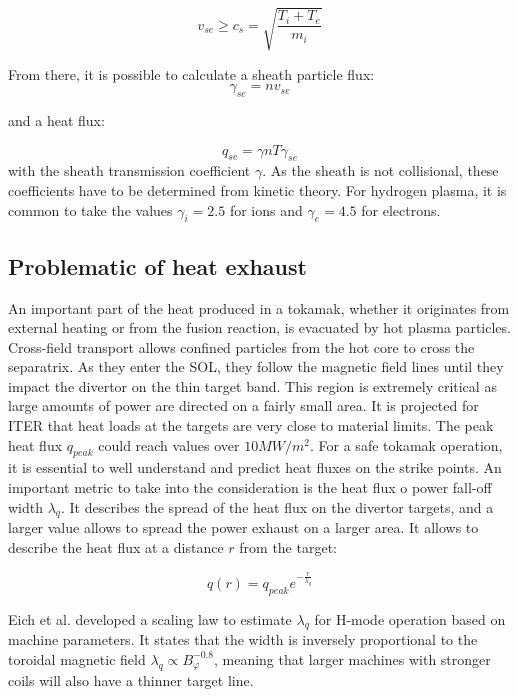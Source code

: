 \begin{equation}
	\label{eq:intro_BohmCriterion}
	v_{se} \ge c_s = \sqrt{\frac{T_i+T_e}{m_i}}
\end{equation}

From there, it is possible to calculate a sheath particle flux:
\begin{equation}
	\gamma_{se} = nv_{se}
\end{equation}

and a heat flux:

\begin{equation}
	q_{se} = \gamma n T \gamma_{se}
\end{equation}
with the sheath transmission coefficient $\gamma$. As the sheath is not collisional, these coefficients have to be determined from kinetic theory\cite{Stangeby_2000}. For hydrogen plasma, it is common to take the values $\gamma_i = 2.5$ for ions and $\gamma_e = 4.5$ for electrons.


\subsection{Problematic of heat exhaust}
\label{ssec:intro_heatExhaust}
An important part of the heat produced in a tokamak, whether it originates from external heating or from the fusion reaction, is evacuated by hot plasma particles. Cross-field transport allows confined particles from the hot core to cross the separatrix. As they enter the SOL, they follow the magnetic field lines until they impact the divertor on the thin target band. This region is extremely critical as large amounts of power are directed on a fairly small area. It is projected for ITER that heat loads at the targets are very close to material limits\cite{gunn2017surface}. The peak heat flux $q_{peak}$ could reach values over $10MW/m^2$. For a safe tokamak operation, it is essential to well understand and predict heat fluxes on the strike points. An important metric to take into the consideration is the heat flux o power fall-off width $\lambda_q$. It describes the spread of the heat flux on the divertor targets, and a larger value allows to spread the power exhaust on a larger area. It allows to describe the heat flux at a distance $r$ from the target:

\begin{equation}
	q(r) =  q_{peak}e^{-\frac{r}{\lambda_q}}
\end{equation}

Eich et al.\cite{eich2013scaling} developed a scaling law to estimate $\lambda_q$ for H-mode operation based on machine parameters. It states that the width is inversely proportional to the toroidal magnetic field $\lambda_q\propto B_\varphi^{-0.8}$, meaning that larger machines with stronger coils will also have a thinner target line. 



